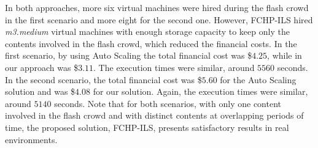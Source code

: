 	In both approaches, more six virtual machines were hired during the flash crowd in the first scenario and more eight for the second one. However,  FCHP-ILS hired \textit{m3.medium} virtual machines with  enough storage capacity to keep only the contents involved in the flash crowd, which reduced the financial costs. In the first scenario, by using Auto Scaling the total financial cost was \$$4.25$, while in our approach was \$$3.11$. The execution times were similar, around $5560$ seconds. In the second scenario, the total financial cost was \$$5.60$ for the Auto Scaling solution and was \$$4.08$ for our solution. Again, the execution times were similar, around $5140$ seconds. Note that for both scenarios, with only one content involved in the flash crowd and with distinct contents at overlapping periods of time, the proposed solution, FCHP-ILS, presents satisfactory results in real environments.